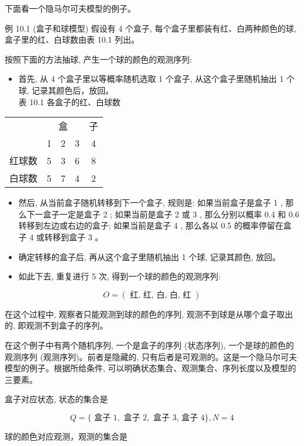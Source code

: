 \documentclass[10pt]{article}
\begin{document}
下面看一个隐马尔可夫模型的例子。

例 10.1 (盒子和球模型) 假设有 4 个盒子, 每个盒子里都装有红、白两种颜色的球, 盒子里的红、白球数由表 10.1 列出。

按照下面的方法抽球, 产生一个球的颜色的观测序列:

\begin{itemize}
  \item 首先, 从 4 个盒子里以等概率随机选取 1 个盒子, 从这个盒子里随机抽出 1 个球, 记录其颜色后，放回。\\
表 10.1 各盒子的红、白球数
\end{itemize}

\begin{center}
\begin{tabular}{ccccc}
\hline
 & \multicolumn{3}{c}{盒} & 子 \\
\cline { 2 - 6 }
 & 1 & 2 & 3 & 4 \\
\hline
红球数 & 5 & 3 & 6 & 8 \\
白球数 & 5 & 7 & 4 & 2 \\
\hline
\end{tabular}
\end{center}

\begin{itemize}
  \item 然后, 从当前盒子随机转移到下一个盒子, 规则是: 如果当前盒子是盒子 1 , 那么下一盒子一定是盒子 2 ; 如果当前是盒子 2 或 3 , 那么分别以概率 0.4 和 0.6 转移到左边或右边的盒子; 如果当前是盒子 4 , 那么各以 0.5 的概率停留在盒子 4 或转移到盒子 3 。
  \item 确定转移的盒子后, 再从这个盒子里随机抽出 1 个球, 记录其颜色, 放回。
  \item 如此下去, 重复进行 5 次, 得到一个球的颜色的观测序列:
\end{itemize}

$$
O=(\text { 红, 红, 白, 白, 红 })
$$

在这个过程中, 观察者只能观测到球的颜色的序列, 观测不到球是从哪个盒子取出的, 即观测不到盒子的序列。

在这个例子中有两个随机序列, 一个是盒子的序列 (状态序列), 一个是球的颜色的观测序列 (观测序列)。前者是隐藏的, 只有后者是可观测的。这是一个隐马尔可夫模型的例子。根据所给条件, 可以明确状态集合、观测集合、序列长度以及模型的三要素。

盒子对应状态, 状态的集合是

$$
Q=\{\text { 盒子 } 1, \text { 盒子 } 2, \text { 盒子 } 3 \text {, 盒子 } 4\}, N=4
$$

球的颜色对应观测，观测的集合是
\end{document}
